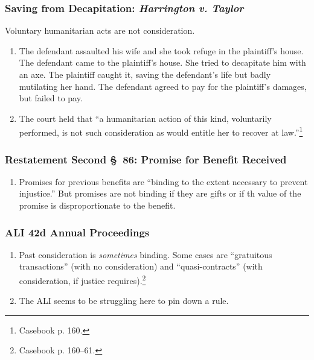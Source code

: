 \subsubsection{Saving from Decapitation: \emph{Harrington v. Taylor}}

Voluntary humanitarian acts are not consideration.

\begin{enumerate}
    \item The defendant assaulted his wife and she took refuge in the 
    plaintiff's house. The defendant came to the plaintiff's house. She tried 
    to decapitate him with an axe. The plaintiff caught it, saving the 
    defendant's life but badly mutilating her hand. The defendant agreed to 
    pay for the plaintiff's damages, but failed to pay.
    \item The court held that ``a humanitarian action of this kind, 
    voluntarily performed, is not such consideration as would entitle her to 
    recover at law.''\footnote{Casebook p. 160.}
\end{enumerate}

\subsubsection{Restatement Second \S\ 86: Promise for Benefit Received}

\begin{enumerate}
    \item Promises for previous benefits are ``binding to the extent necessary 
    to prevent injustice.'' But promises are not binding if they are gifts or 
    if th value of the promise is disproportionate to the benefit.
\end{enumerate}

\subsubsection{ALI 42d Annual Proceedings}

\begin{enumerate}
    \item Past consideration is \emph{sometimes} binding. Some cases are 
    ``gratuitous transactions'' (with no consideration) and 
    ``quasi-contracts'' (with consideration, if justice 
    requires).\footnote{Casebook p. 160--61.}
    \item The ALI seems to be struggling here to pin down a rule.
\end{enumerate}

